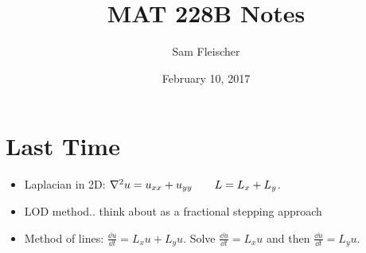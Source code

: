 \documentclass{article}
\title{MAT 228B Notes}
\author{Sam Fleischer}
\date{February 10, 2017}
\begin{document}
    \maketitle

    \section{Last Time}
        \begin{itemize}
            \item Laplacian in 2D: $\laplacian u = u_{xx} + u_{yy}\qquad L = L_x + L_y$.
            \item LOD method.. think about as a fractional stepping approach
            \item Method of lines: $\frac{\dd u}{\dd t} = L_x u + L_y u$.  Solve $\frac{\dd u}{\dd t} = L_xu$ and then $\frac{\dd u}{\dd t} = L_yu$.
        \end{itemize}
\end{document}
